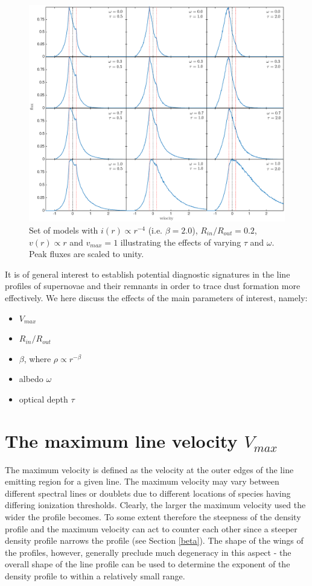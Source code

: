 \begin{figure}
\includegraphics[trim =80 60 40 15,clip=true,scale=0.45]{chapters/chapter4/images/params/C/C_all}
\caption{Set of models with $i(r) \propto r^{-4}$ (i.e. $\beta=2.0$), $R_{in}/R_{out}=0.2$, $v(r) \propto r$  
and $v_{max}=1$ illustrating the effects of varying $\tau$ and $\omega$. 
Peak fluxes are scaled to unity.}
\label{wt}
\end{figure}


It is of general interest to establish potential diagnostic signatures in 
the line profiles of supernovae and their remnants in order to trace dust 
formation more effectively.  We here discuss the effects of the main 
parameters of interest, namely:

\begin{itemize}
\item $V_{max}$
\item $R_{in}/R_{out}$
\item $\beta$, where $\rho \propto r^{-\beta}$
\item albedo $\omega$ 
\item optical depth  $\tau$
\end{itemize}


\section{The maximum line velocity $V_{max}$}

The maximum velocity is defined as the velocity at the outer edges of 
the line emitting region for a given line.  The 
maximum velocity may vary between different spectral lines or doublets due 
to different locations of  species having differing ionization 
thresholds.  Clearly, the larger the maximum velocity used the wider the 
profile becomes.  To some extent therefore the steepness of the density 
profile and the maximum velocity can act to counter each other since a steeper 
density profile narrows the profile (see Section \ref{beta}).  The shape 
of the wings of the profiles, however, generally preclude much degeneracy 
in this aspect - the overall shape of the line profile can be used to determine the 
exponent of the density profile to within a relatively small range.

